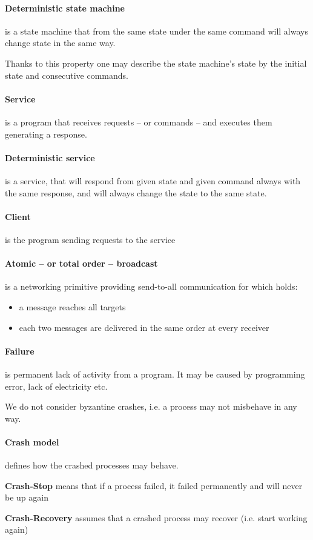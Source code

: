 \paragraph{Deterministic state machine}
is a state machine that from the same state under the same command will always change state in the same way.

Thanks to this property one may describe the state machine's state by the initial state and consecutive commands. 

\paragraph{Service}
is a program that receives requests -- or commands -- and executes them generating a response.

\paragraph{Deterministic service}
is a service, that will respond from given state and given command always with the same response, and will always change the state to the same state.

\paragraph{Client}
is the program sending requests to the service

\paragraph{Atomic -- or total order -- broadcast}
is a networking primitive providing send-to-all communication for which holds:
\begin{itemize}
 \item a message reaches all targets
 \item each two messages are delivered in the same order at every receiver
\end{itemize}

\paragraph{Failure}
is permanent lack of activity from a program. It may be caused by programming error, lack of electricity etc.

We do not consider byzantine crashes, i.e. a process may not misbehave in any way.

\paragraph{Crash model}
defines how the crashed processes may behave.
\begin{list}{}{ \setlength{\leftmargin}{0.2\textwidth} \setlength{\itemindent}{-0.1\textwidth}}
 \item[\textbf{Crash-Stop}] means that if a process failed, it failed permanently and will never be up again
 \item[\textbf{Crash-Recovery}] assumes that a crashed process may recover (i.e. start working again)
\end{list}


